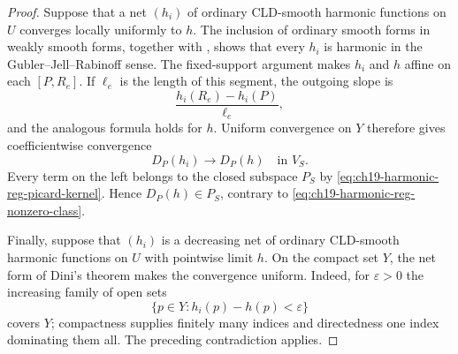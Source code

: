 \begin{proof}
Suppose that a net $(h_i)$ of ordinary CLD-smooth harmonic functions on $U$
converges locally uniformly to $h$.  The inclusion of ordinary smooth forms
in weakly smooth forms, together with \cite[Propositions~10.14 and
10.17]{GJR26}, shows that every $h_i$ is harmonic in the
Gubler--Jell--Rabinoff sense.  The fixed-support argument makes $h_i$ and $h$
affine on each $[P,R_e]$.  If $\ell_e$ is the length of this segment, the
outgoing slope is
\begin{equation}
\label{eq:ch19-harmonic-reg-slope-values}
                         \frac{h_i(R_e)-h_i(P)}{\ell_e},
\end{equation}
and the analogous formula holds for $h$.  Uniform convergence on $Y$
therefore gives coefficientwise convergence
\begin{equation}
\label{eq:ch19-harmonic-reg-divisor-limit}
                         D_P(h_i)\longrightarrow D_P(h)
                         \quad\text{in }V_S.
\end{equation}
Every term on the left belongs to the closed subspace $P_S$ by
\eqref{eq:ch19-harmonic-reg-picard-kernel}.  Hence $D_P(h)\in P_S$, contrary
to \eqref{eq:ch19-harmonic-reg-nonzero-class}.

Finally, suppose that $(h_i)$ is a decreasing net of ordinary CLD-smooth
harmonic functions on $U$ with pointwise limit $h$.  On the compact set $Y$,
the net form of Dini's theorem makes the convergence uniform.  Indeed, for
$\varepsilon>0$ the increasing family of open sets
\[
              \{p\in Y:h_i(p)-h(p)<\varepsilon\}
\]
covers $Y$; compactness supplies finitely many indices and directedness one
index dominating them all.  The preceding contradiction applies.
\end{proof}
